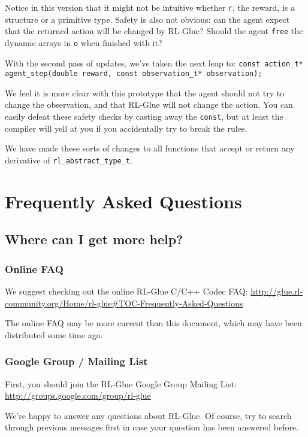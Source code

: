 \documentclass[11pt]{article}
\begin{document}
Notice in this version that it might not be intuitive whether \texttt{r}, the reward, is a structure or a primitive type.  
Safety is also not obvious: can the agent expect that the returned action will be changed by RL-Glue?  Should the agent 
\texttt{free} the dynamic arrays in \texttt{o} when finished with it? 

With the second pass of updates, we've taken the next leap to:\newline
\texttt{const action\_t* agent\_step(double reward, const observation\_t* observation);}

We feel it is more clear with this prototype that the agent should not try to change the observation, and that 
RL-Glue will not change the action.  You can easily defeat these safety checks by casting away the \texttt{const}, 
but at least the compiler will yell at you if you accidentally try to break the rules.

We have made these sorts of changes to all functions that accept or return any derivative of 
\texttt{rl\_abstract\_type\_t}.





\section{Frequently Asked Questions}
\subsection{Where can I get more help?}
\subsubsection{Online FAQ}
We suggest checking out the online RL-Glue C/C++ Codec FAQ:\newline
\url{http://glue.rl-community.org/Home/rl-glue#TOC-Frequently-Asked-Questions}

The online FAQ may be more current than this document, which may have been distributed some time ago.

\subsubsection{Google Group / Mailing List}
First, you should join the RL-Glue Google Group Mailing List:\newline
\url{http://groups.google.com/group/rl-glue}

We're happy to answer any questions about RL-Glue.  Of course, try to search through previous messages first in case your question has been answered before.
\end{document}
